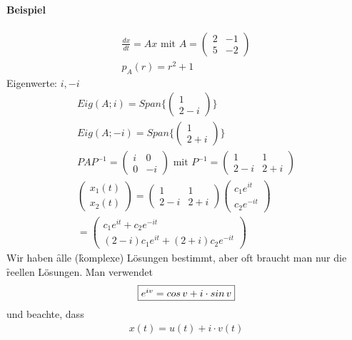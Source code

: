 \paragraph{Beispiel}
\begin{align}
\frac{dx}{dt} = Ax \text{ mit } A = \begin{pmatrix} 2 & -1 \\ 5 & -2\end{pmatrix} \\
p_A(r) = r^2 + 1
\end{align}
Eigenwerte: $i, -i$
\begin{align}
Eig(A; i) = Span\{\begin{pmatrix} 1 \\ 2-i\end{pmatrix}\} \\
Eig(A; -i) = Span\{\begin{pmatrix} 1 \\ 2+i\end{pmatrix}\} \\
PAP^{-1} = \begin{pmatrix} i & 0 \\ 0 & -i \end{pmatrix} \text{ mit } P^{-1} = \begin{pmatrix} 1 & 1 \\ 2-i & 2+ i\end{pmatrix} \\
\begin{pmatrix} x_1(t) \\ x_2(t) \end{pmatrix} = \begin{pmatrix} 1 & 1 \\ 2-i & 2+i\end{pmatrix} \begin{pmatrix} c_1 e^{it} \\ c_2 e^{-it}\end{pmatrix} \\
= \begin{pmatrix} c_1 e^{it} + c_2 e^{-it} \\ (2-i) c_1 e^{it} + (2+i) c_2 e^{-it}\end{pmatrix}
\end{align}
Wir haben \f{alle} (\f{komplexe}) Lösungen bestimmt, aber oft braucht man nur die \f{reellen Lösungen}.
Man verwendet 
\begin{align}
\fbox{$e^{iv} = cos\, v + i \cdot sin\, v$}
\end{align}
und beachte, dass
\begin{align}
x(t) = u(t) + i\cdot v(t)\\
\end{align}
